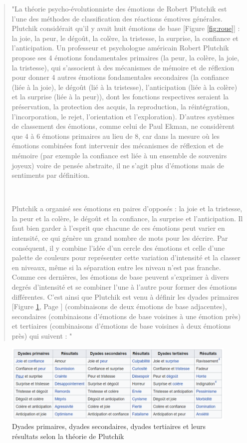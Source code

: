 \begin{quotation}

 "La théorie psycho-évolutionniste des émotions de Robert Plutchik \parencite{plutchik} est l'une des méthodes de classification des réactions émotives générales. Plutchik considérait qu'il y avait huit émotions de base [Figure \ref{fig:roue}] : la joie, la peur, le dégoût, la colère, la tristesse, la surprise, la confiance et l'anticipation. Un professeur et psychologue américain Robert Plutchik propose ses 4 émotions fondamentales primaires (la peur, la colère, la joie, la tristesse), qui s'associent à des mécanismes de mémoire et de réflexion pour donner 4 autres émotions fondamentales secondaires (la confiance (liée à la joie), le dégoût (lié à la tristesse), l'anticipation (liée à la colère) et la surprise (liée à la peur)), dont les fonctions respectives seraient la préservation, la protection des acquis, la reproduction, la réintégration, l'incorporation, le rejet, l'orientation et l'exploration). D'autres systèmes de classement des émotions, comme celui de Paul Ekman, ne considèrent que 4 à 6 émotions primaires au lieu de 8, car dans la mesure où les émotions combinées font intervenir des mécanismes de réflexion et de mémoire (par exemple la confiance est liée à un ensemble de souvenirs joyeux) voire de pensée abstraite, il ne s'agit plus d'émotions mais de sentiments par définition.

~\par
Plutchik a organisé ses émotions en paires d'opposés : la joie et la tristesse, la peur et la colère, le dégoût et la confiance, la surprise et l'anticipation. Il faut bien garder à l'esprit que chacune de ces émotions peut varier en intensité, ce qui génère un grand nombre de mots pour les décrire. Par conséquent, il y combine l'idée d'un cercle des émotions et celle d'une palette de couleurs pour représenter cette variation d'intensité et la classer en niveaux, même si la séparation entre les niveau n'est pas franche. Comme ces dernières, les émotions de base peuvent s'exprimer à divers degrés d'intensité et se combiner l'une à l'autre pour former des émotions différentes. C'est ainsi que Plutchik est venu à définir les dyades primaires [Figure \ref{fig:TbEm}, Page \pageref{fig:TbEm}] (combinaisons de deux émotions de base adjacentes), secondaires (combinaisons d'émotions de base voisines à une émotion près) et tertiaires (combinaisons d'émotions de base voisines à deux émotions près) qui suivent   \parencite{tayari2009modelisation} : "

\end{quotation}


\begin{figure}[th]
\hspace*{-1.9cm} 
\centering
\includegraphics{Figures/tableauEmotions.PNG}
\decoRule
\caption[Tableau de la théorie de Plutchik]{Dyades primaires, dyades secondaires, dyades tertiaires et leurs résultats selon la théorie de Plutchik}
\label{fig:TbEm}
\end{figure}




